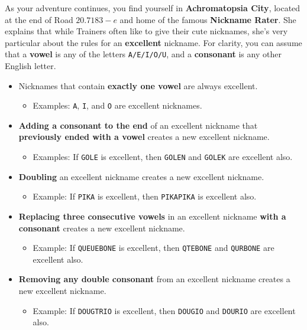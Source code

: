 

As your adventure continues, you find yourself in
\textbf{Achromatopsia City}, located at the end of Road \(20.7183-e\)
and home of the famous \textbf{Nickname Rater}.
She explains that while Trainers often like to give their
\mappMobimon{} cute nicknames, she's very particular about the rules
for an \textbf{excellent} nickname. For clarity, you can assume
that a \textbf{vowel} is any of the letters \texttt{A/E/I/O/U}, and a
\textbf{consonant} is any other English letter.

\begin{itemize}
  \item Nicknames that contain \textbf{exactly one vowel} are always excellent.
    \begin{itemize}
      \item Examples: \texttt{A}, \texttt{I}, and \texttt{O} are
            excellent nicknames.
    \end{itemize}
  \item \textbf{Adding a consonant to the end} of an excellent nickname
        that \textbf{previously ended with a vowel}
        creates a new excellent nickname.
    \begin{itemize}
      \item Examples: If \texttt{GOLE} is excellent, then
            \texttt{GOLEN} and \texttt{GOLEK} are excellent also.
    \end{itemize}
  \item \textbf{Doubling} an excellent nickname creates a new excellent
        nickname.
    \begin{itemize}
      \item Example: If \texttt{PIKA} is excellent, then
            \texttt{PIKAPIKA} is excellent also.
    \end{itemize}
  \item \textbf{Replacing three consecutive vowels} in
        an excellent nickname \textbf{with a consonant}
        creates a new excellent nickname.
    \begin{itemize}
      \item Example: If \texttt{QUEUEBONE} is excellent, then
        \texttt{QTEBONE} and \texttt{QURBONE} are excellent also.
    \end{itemize}
  \item \textbf{Removing any double consonant} from an excellent nickname
        creates a new excellent nickname.
    \begin{itemize}
      \item Example: If \texttt{DOUGTRIO} is excellent, then
        \texttt{DOUGIO} and \texttt{DOURIO} are excellent also.
    \end{itemize}
\end{itemize}

